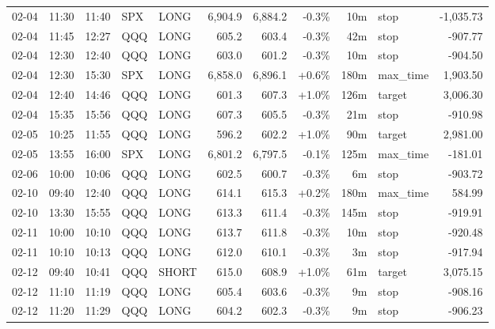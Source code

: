 \documentclass[11pt,a4paper,twoside]{article}
\begin{document}
\begin{center}
\begin{longtable}{>{\color{txtmain}}l l l l l r r r r >{\color{txtmain}}l r}
02-04 & 11:30 & 11:40 & SPX & LONG & 6,904.9 & 6,884.2 & \textcolor{lossred}{-0.3\%} & 10m & stop & \textcolor{lossred}{-1,035.73} \\
02-04 & 11:45 & 12:27 & QQQ & LONG & 605.2 & 603.4 & \textcolor{lossred}{-0.3\%} & 42m & stop & \textcolor{lossred}{-907.77} \\
02-04 & 12:30 & 12:40 & QQQ & LONG & 603.0 & 601.2 & \textcolor{lossred}{-0.3\%} & 10m & stop & \textcolor{lossred}{-904.50} \\
02-04 & 12:30 & 15:30 & SPX & LONG & 6,858.0 & 6,896.1 & \textcolor{wingreen}{+0.6\%} & 180m & max\_time & \textcolor{wingreen}{1,903.50} \\
02-04 & 12:40 & 14:46 & QQQ & LONG & 601.3 & 607.3 & \textcolor{wingreen}{+1.0\%} & 126m & target & \textcolor{wingreen}{3,006.30} \\
02-04 & 15:35 & 15:56 & QQQ & LONG & 607.3 & 605.5 & \textcolor{lossred}{-0.3\%} & 21m & stop & \textcolor{lossred}{-910.98} \\
02-05 & 10:25 & 11:55 & QQQ & LONG & 596.2 & 602.2 & \textcolor{wingreen}{+1.0\%} & 90m & target & \textcolor{wingreen}{2,981.00} \\
02-05 & 13:55 & 16:00 & SPX & LONG & 6,801.2 & 6,797.5 & \textcolor{lossred}{-0.1\%} & 125m & max\_time & \textcolor{lossred}{-181.01} \\
02-06 & 10:00 & 10:06 & QQQ & LONG & 602.5 & 600.7 & \textcolor{lossred}{-0.3\%} & 6m & stop & \textcolor{lossred}{-903.72} \\
02-10 & 09:40 & 12:40 & QQQ & LONG & 614.1 & 615.3 & \textcolor{wingreen}{+0.2\%} & 180m & max\_time & \textcolor{wingreen}{584.99} \\
02-10 & 13:30 & 15:55 & QQQ & LONG & 613.3 & 611.4 & \textcolor{lossred}{-0.3\%} & 145m & stop & \textcolor{lossred}{-919.91} \\
02-11 & 10:00 & 10:10 & QQQ & LONG & 613.7 & 611.8 & \textcolor{lossred}{-0.3\%} & 10m & stop & \textcolor{lossred}{-920.48} \\
02-11 & 10:10 & 10:13 & QQQ & LONG & 612.0 & 610.1 & \textcolor{lossred}{-0.3\%} & 3m & stop & \textcolor{lossred}{-917.94} \\
02-12 & 09:40 & 10:41 & QQQ & SHORT & 615.0 & 608.9 & \textcolor{wingreen}{+1.0\%} & 61m & target & \textcolor{wingreen}{3,075.15} \\
02-12 & 11:10 & 11:19 & QQQ & LONG & 605.4 & 603.6 & \textcolor{lossred}{-0.3\%} & 9m & stop & \textcolor{lossred}{-908.16} \\
02-12 & 11:20 & 11:29 & QQQ & LONG & 604.2 & 602.3 & \textcolor{lossred}{-0.3\%} & 9m & stop & \textcolor{lossred}{-906.23} \\

\end{longtable}
\end{center}
\end{document}
